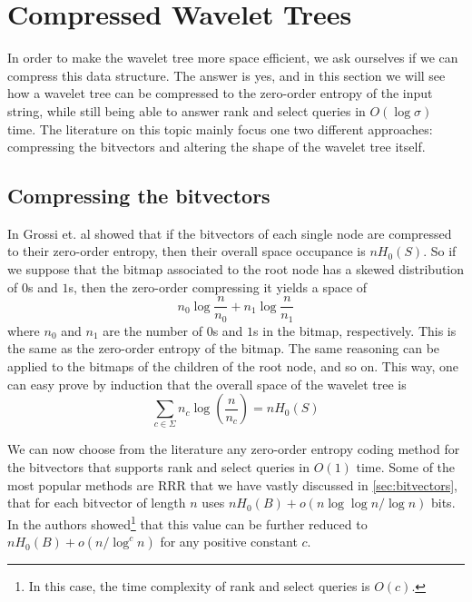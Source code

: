 \clearpage
\section{Compressed Wavelet Trees} \label{sec:compressed_WT}
In order to make the wavelet tree more space efficient, we ask ourselves if we can compress this data structure. The answer is yes, and in this section we will see how a wavelet tree can be compressed to the zero-order entropy of the input string, while still being able to answer rank and select queries in $O(\log \sigma)$ time. The literature on this topic mainly focus one two different approaches: compressing the bitvectors and altering the shape of the wavelet tree itself.

\subsection{Compressing the bitvectors} \label{subsec:compressing_bitvectors}
In \cite{GrossiWT2003} Grossi et. al showed that if the bitvectors of each single node are compressed to their zero-order entropy, then their overall space occupance is $n H_0(S)$. So if we suppose that the bitmap associated to the root node has a skewed distribution of $0$s and $1$s, then the zero-order compressing it yields a space of
\begin{equation}
    n_0 \log \frac{n}{n_0} + n_1 \log \frac{n}{n_1}
\end{equation}
where $n_0$ and $n_1$ are the number of $0$s and $1$s in the bitmap, respectively. This is the same as the zero-order entropy of the bitmap. The same reasoning can be applied to the bitmaps of the children of the root node, and so on. This way, one can easy prove by induction \cite{navarro2016compact} that the overall space of the wavelet tree is
\begin{equation}
    \sum_{c \in \Sigma} n_c \log (\frac{n}{n_c}) = n H_0(S)
\end{equation}

\noindent We can now choose from the literature any zero-order entropy coding method for the bitvectors that supports rank and select queries in $O(1)$ time. Some of the most popular methods are RRR \cite{RRR2002} that we have vastly discussed in \autoref{sec:bitvectors}, that for each bitvector of length $n$ uses $n H_0(B) + o(n \log \log n / \log n)$ bits. In \cite{patrascu2008succincter} the authors showed\footnote{In this case, the time complexity of rank and select queries is $O(c)$.} that this value can be further reduced to $n H_0(B) + o(n/\log^c n)$ for any positive constant $c$.

